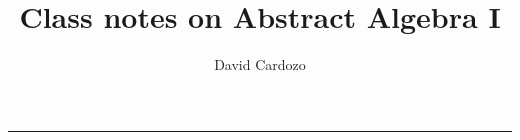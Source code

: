\documentclass[notitlepage]{article}
\author{David Cardozo}
\title{Class notes on Abstract Algebra I}
\begin{document}



\noindent\rule{\textwidth}{1pt}\\[-0.1cm]


	
	
\end{document}

